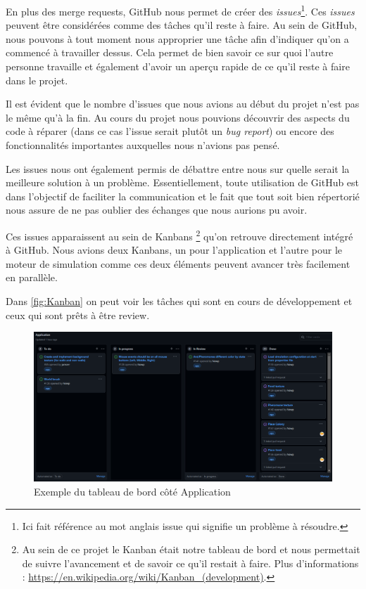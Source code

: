 \documentclass{EPUProjetDi}
\begin{document}
En plus des merge requests, GitHub nous permet de créer des \textit{issues}\footnote{Ici fait référence 
au mot anglais issue qui signifie un problème à résoudre.}.
Ces \textit{issues} peuvent être considérées comme des tâches qu'il reste à faire. Au sein de GitHub, nous
pouvons à tout moment nous approprier une tâche afin d'indiquer qu'on a commencé à travailler dessus. Cela 
permet de bien savoir ce sur quoi l'autre personne travaille et également d'avoir un aperçu rapide de ce qu'il reste à faire dans le projet.

Il est évident que le nombre d'issues que nous avions au début du projet n'est pas le même qu'à la fin. Au cours du projet nous
pouvions découvrir des aspects du code à réparer (dans ce cas l'issue serait plutôt un \textit{bug report}) ou encore des fonctionnalités
importantes auxquelles nous n'avions pas pensé.

Les issues nous ont également permis de débattre entre nous sur quelle serait la meilleure solution à un problème. Essentiellement, toute utilisation
de GitHub est dans l'objectif de faciliter la communication et le fait que tout soit bien répertorié nous assure de ne pas oublier des échanges que 
nous aurions pu avoir.

Ces issues apparaissent au sein de Kanbans \footnote{Au sein de ce projet le Kanban était notre tableau de bord et nous permettait de suivre 
l'avancement et de savoir ce qu'il restait à faire. Plus d'informations : \url{https://en.wikipedia.org/wiki/Kanban_(development)}.}
qu'on retrouve directement intégré à GitHub. Nous avions deux Kanbans, un pour l'application et l'autre pour le moteur de simulation comme ces deux éléments peuvent avancer très facilement en parallèle.

Dans \autoref{fig:Kanban} on peut voir les tâches qui sont en cours de développement et ceux qui sont prêts à être review.

\begin{figure}[h]
\centering
\includegraphics[scale=.3]{kanban.png}
\caption{Exemple du tableau de bord côté Application}
\label{fig:Kanban}
\end{figure}
\end{document}
